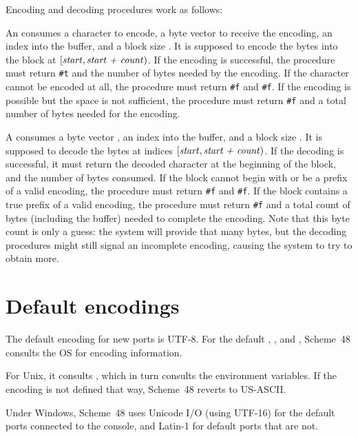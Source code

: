 Encoding and decoding procedures work as follows:
%
\begin{protos}
\end{protos}
%
An  consumes a character  to encode, a
byte vector  to receive the encoding, an index 
into the buffer, and a block size .  It is supposed to
encode the bytes into the block at $\left[\textnormal{\textit{start}}, \textnormal{\textit{start +
    count}}\right)$.  If the encoding is successful, the procedure must
return \texttt{\#t} and the number of bytes needed by the encoding.
If the character cannot be encoded at all, the procedure must return
\texttt{\#f} and \texttt{\#f}.  If the encoding is possible but the
space is not sufficient, the procedure must return \texttt{\#f} and a
total number of bytes needed for the encoding.

A  consumes a byte vector , an index
 into the buffer, and a block size .  It is
supposed to decode the bytes at indices $\left[\textnormal{\textit{start}}, \textnormal{\textit{start
    + count}}\right)$.  If the decoding is successful, it must return
the decoded character at the beginning of the block, and the number of
bytes consumed.  If the block cannot begin with or be a prefix of a
valid encoding, the procedure must return \texttt{\#f} and
\texttt{\#f}.  If the block contains a true prefix of a valid
encoding, the procedure must return \texttt{\#f} and a total count of
bytes (including the buffer) needed to complete the encoding.  Note
that this byte count is only a guess: the system will provide that
many bytes, but the decoding procedures might still signal an
incomplete encoding, causing the system to try to obtain more. 

\section{Default encodings}

The default encoding for new ports is UTF-8.  For the default
, , and
, Scheme~48 consults the OS for encoding
information.

For Unix, it consults , which in turn consults
the  environment variables.  If the encoding is not defined
that way, Scheme~48 reverts to US-ASCII.

Under Windows, Scheme~48 uses Unicode I/O (using UTF-16) for the
default ports connected to the console, and Latin-1 for default ports
that are not.

